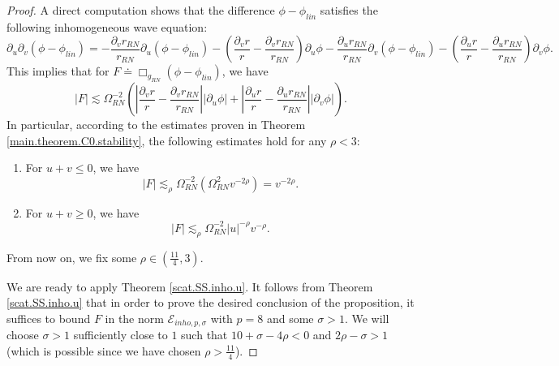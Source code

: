 \documentclass[10pt, reqno]{amsart}
\theoremstyle{definition}
\theoremstyle{remark}
\numberwithin{equation}{section}
\newcommand{\rd}{\partial}
\newcommand{\0}{\emptyset}
\newcommand{\Omg}{\Omega}
\newcommand{\f}{\frac}
\begin{document}
\begin{proof}
 A direct computation shows that the difference $\phi-\phi_{lin}$ satisfies the following inhomogeneous wave equation:
$$\rd_u\rd_v(\phi-\phi_{lin})=-\f{\rd_v r_{RN}}{r_{RN}}\rd_u(\phi-\phi_{lin})-\left(\f{\rd_v r}{r}-\f{\rd_v r_{RN}}{r_{RN}}\right)\rd_u\phi-\f{\rd_u r_{RN}}{r_{RN}}\rd_v(\phi-\phi_{lin})-\left(\f{\rd_u r}{r}-\f{\rd_u r_{RN}}{r_{RN}}\right)\rd_v\phi.$$
This implies that for $F \doteq \Box_{g_{RN}}(\phi-\phi_{lin})$, we have
$$|F|\lesssim \Omg^{-2}_{RN}\left(\left|\f{\rd_v r}{r}-\f{\rd_v r_{RN}}{r_{RN}}\right||\rd_u\phi|+\left|\f{\rd_u r}{r}-\f{\rd_u r_{RN}}{r_{RN}}\right||\rd_v\phi|\right).$$
In particular, according to the estimates proven in Theorem \ref{main.theorem.C0.stability}, the following estimates hold for any $\rho<3$: 


\begin{enumerate}
\item 
For $u+v\leq 0$, we have\begin{equation}\label{eq:F.est.trivial.1}
|F|\lesssim_{\rho} \Omg^{-2}_{RN}( \Omg_{RN}^2 v^{-2\rho})=v^{-2\rho}.
\end{equation}
\item
For $u+v\geq 0$, we have
\begin{equation}\label{eq:F.est.trivial.2}
|F|\lesssim_{\rho} \Omg^{-2}_{RN} |u|^{-\rho}v^{-\rho}.
\end{equation}
\end{enumerate}

From now on, we fix some $\rho\in (\f {11}4, 3)$.


We are ready to apply Theorem \ref{scat.SS.inho.u}. It follows from Theorem \ref{scat.SS.inho.u} that in order to prove the desired conclusion of the proposition, it suffices to bound $F$ in the norm $\mathcal E_{inho,p,\sigma}$ with $p=8$ and some $\sigma >1$. We will choose $\sigma>1$ sufficiently close to $1$ such that $10+\sigma -4\rho <0$ and $2\rho-\sigma >1$ (which is possible since we have chosen $\rho>\f {11}4$).


\end{proof}
\end{document}
